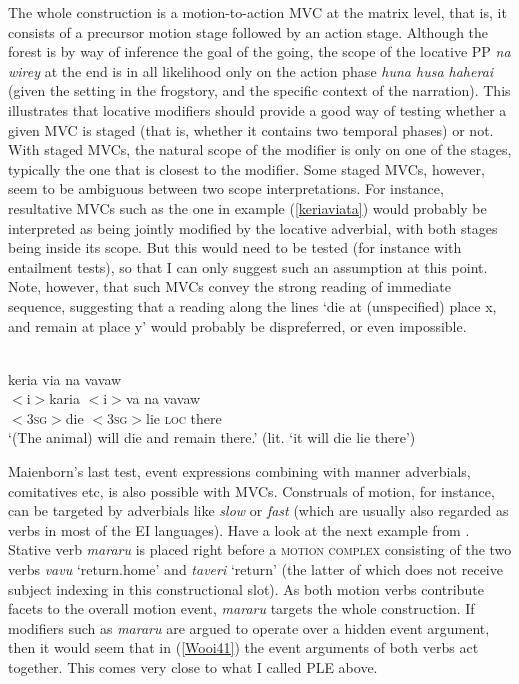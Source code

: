 \newpage
The whole construction is a motion-to-action MVC at the matrix level, that is, it consists of a precursor motion stage followed by an action stage. Although the forest is by way of inference the goal of the going, the scope of the locative PP \textit{na wirey} at the end is in all likelihood only on the action phase \textit{huna husa haherai} (given the setting in the frogstory, and the specific context of the narration). This illustrates that locative modifiers should provide a good way of testing whether a given MVC is staged (that is, whether it contains two temporal phases) or not. With staged MVCs, the natural scope of the modifier is only on one of the stages, typically the one that is closest to the modifier. Some staged MVCs, however, seem to be ambiguous between two scope interpretations. For instance, resultative MVCs such as the one in example (\ref{keriaviata}) would probably be interpreted as being jointly modified by the locative adverbial, with both stages being inside its scope. But this would need to be tested (for instance with entailment tests), so that I can only suggest such an assumption at this point. Note, however, that such MVCs convey the strong reading of immediate sequence, suggesting that a reading along the lines `die at (unspecified) place x, and remain at place y' would probably be dispreferred, or even impossible.

\ea \label{keriaviata} 
\\
\glll keria via na vavaw \\
$<$i$>$karia $<$i$>$va na vavaw \\
$<$3\textsc{sg}$>$die $<$3\textsc{sg}$>$lie \textsc{loc} there\\
\glft `(The animal) will die and remain there.' (lit. `it will die lie there')\\ 
\z

Maienborn's last test, event expressions combining with manner adverbials, comitatives etc, is also possible with MVCs. Construals of motion, for instance, can be targeted by adverbials like \textit{slow} or \textit{fast} (which are usually also regarded as verbs in most of the EI languages). Have a look at the next example from . Stative verb \textit{mararu} is placed right before a \textsc{motion complex} consisting of the two verbs \textit{vavu} `return.home' and \textit{taveri} `return' (the latter of which does not receive subject indexing in this constructional slot). As both motion verbs contribute facets to the overall motion event, \textit{mararu} targets the whole construction. If modifiers such as \textit{mararu} are argued to operate over a hidden event argument, then it would seem that in (\ref{Wooi41}) the event arguments of both verbs act together. This comes very close to what I called PLE above.

